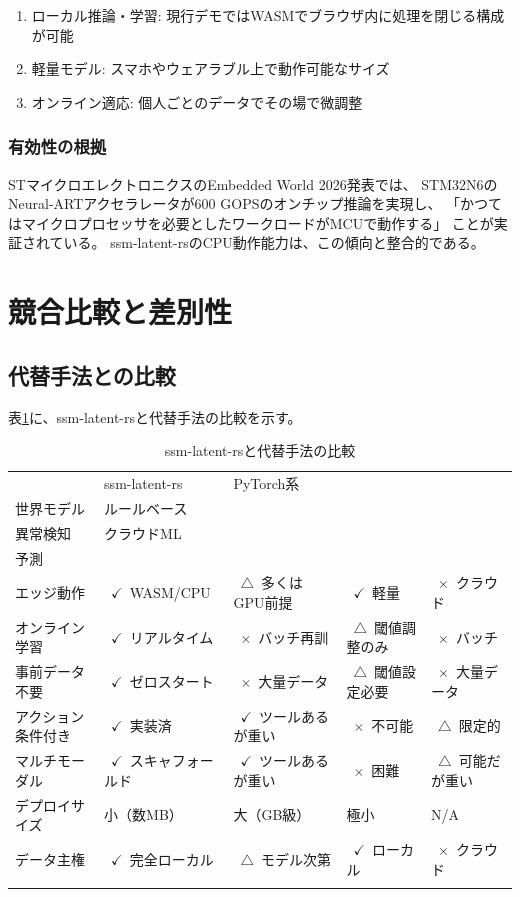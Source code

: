 \documentclass[11pt,a4paper]{ltjsarticle}
\begin{document}
\begin{enumerate}
  \item ローカル推論・学習: 現行デモではWASMでブラウザ内に処理を閉じる構成が可能
  \item 軽量モデル: スマホやウェアラブル上で動作可能なサイズ
  \item オンライン適応: 個人ごとのデータでその場で微調整
\end{enumerate}

\subsubsection{有効性の根拠}

STマイクロエレクトロニクスのEmbedded World 2026発表では、
STM32N6のNeural-ARTアクセラレータが600 GOPSのオンチップ推論を実現し、
「かつてはマイクロプロセッサを必要としたワークロードがMCUで動作する」
ことが実証されている\cite{st2026ew}。
ssm-latent-rsのCPU動作能力は、この傾向と整合的である。

\section{競合比較と差別性}

\subsection{代替手法との比較}

表\ref{tab:competitor_comparison}に、ssm-latent-rsと代替手法の比較を示す。

{\footnotesize
\setlength{\tabcolsep}{2pt}
\begin{longtable}{p{27mm}p{28mm}p{31mm}p{29mm}p{29mm}}
\toprule
 & ssm-latent-rs & PyTorch系\\世界モデル & ルールベース\\異常検知 & クラウドML\\予測 \\
\midrule
\endhead
エッジ動作 & ~$\checkmark$~WASM/CPU & ~$\triangle$~多くはGPU前提 & ~$\checkmark$~軽量 & ~$\times$~クラウド \\
オンライン学習 & ~$\checkmark$~リアルタイム & ~$\times$~バッチ再訓 & ~$\triangle$~閾値調整のみ & ~$\times$~バッチ \\
事前データ不要 & ~$\checkmark$~ゼロスタート & ~$\times$~大量データ & ~$\triangle$~閾値設定必要 & ~$\times$~大量データ \\
アクション条件付き & ~$\checkmark$~実装済 & ~$\checkmark$~ツールあるが重い & ~$\times$~不可能 & ~$\triangle$~限定的 \\
マルチモーダル & ~$\checkmark$~スキャフォールド & ~$\checkmark$~ツールあるが重い & ~$\times$~困難 & ~$\triangle$~可能だが重い \\
デプロイサイズ & 小（数MB） & 大（GB級） & 極小 & N/A \\
データ主権 & ~$\checkmark$~完全ローカル & ~$\triangle$~モデル次第 & ~$\checkmark$~ローカル & ~$\times$~クラウド \\
\bottomrule
\caption{ssm-latent-rsと代替手法の比較}
\label{tab:competitor_comparison}
\end{longtable}
}
\end{document}
